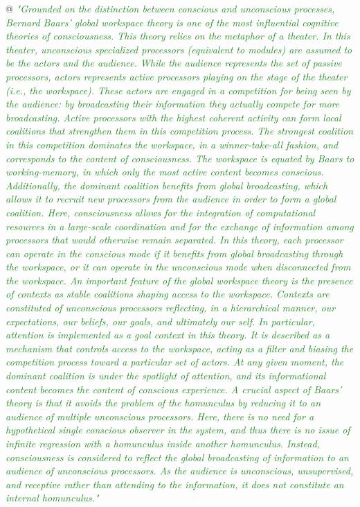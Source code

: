 \documentclass[utf8]{article}
\newenvironment{ants}
			{
			 \begin{easylist}[itemize]
			}
			{
			\end{easylist}
			}
\newcommand{\rewrite}[1]{\textcolor{ForestGreen}{\textit{"#1"}}\newline}
\begin{document}
\begin{ants}
				@ \rewrite{Grounded on the distinction between conscious and unconscious processes, Bernard Baars’ global workspace theory is one of the most influential cognitive theories of consciousness. This theory relies on the metaphor of a theater. In this theater, unconscious specialized processors (equivalent to modules) are assumed to be the actors and the audience. While the audience represents the set of passive processors, actors represents active processors playing on the stage of the theater (i.e., the workspace). These actors are engaged in a competition for being seen by the audience: by broadcasting their information they actually compete for more broadcasting. Active processors with the highest coherent activity can form local coalitions that strengthen them in this competition process. The strongest coalition in this competition dominates the workspace, in a winner-take-all fashion, and corresponds to the content of consciousness. The workspace is equated by Baars to working-memory, in which only the most active content becomes conscious. Additionally, the dominant coalition benefits from global broadcasting, which allows it to recruit new processors from the audience in order to form a global coalition. Here, consciousness allows for the integration of computational resources in a large-scale coordination and for the exchange of information among processors that would otherwise remain separated. In this theory, each processor can operate in the conscious mode if it benefits from global broadcasting through the workspace, or it can operate in the unconscious mode when disconnected from the workspace. An important feature of the global workspace theory is the presence of contexts as stable coalitions shaping access to the workspace. Contexts are constituted of unconscious processors reflecting, in a hierarchical manner, our expectations, our beliefs, our goals, and ultimately our self. In particular, attention is implemented as a goal context in this theory. It is described as a mechanism that controls access to the workspace, acting as a filter and biasing the competition process toward a particular set of actors. At any given moment, the dominant coalition is under the spotlight of attention, and its informational content becomes the content of conscious experience. A crucial aspect of Baars’ theory is that it avoids the problem of the homunculus by reducing it to an audience of multiple unconscious processors. Here, there is no need for a hypothetical single conscious observer in the system, and thus there is no issue of infinite regression with a homunculus inside another homunculus. Instead, consciousness is considered to reflect the global broadcasting of information to an audience of unconscious processors. As the audience is unconscious, unsupervised, and receptive rather than attending to the information, it does not constitute an internal homunculus.}
				
				
				
			\end{ants}
		
\end{document}
